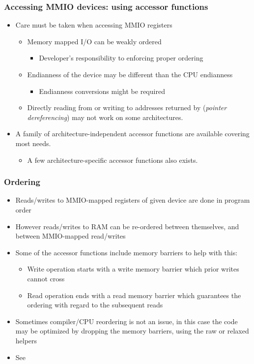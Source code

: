 \begin{frame}[fragile]
  \frametitle{Accessing MMIO devices: using accessor functions}
  \begin{itemize}
  \item Care must be taken when accessing MMIO registers
    \begin{itemize}
    \item Memory mapped I/O can be weakly ordered
      \begin{itemize}
      \item Developer's responsibility to enforcing proper ordering
      \end{itemize}
    \item Endianness of the device may be different than the CPU endianness
      \begin{itemize}
      \item Endianness conversions might be required
      \end{itemize}
    \item Directly reading from or writing to addresses returned by
       (\emph{pointer dereferencing}) may not work on some
      architectures.
    \end{itemize}
  \item A family of architecture-independent accessor functions are
    available covering most needs.
    \begin{itemize}
    \item A few architecture-specific accessor functions also exists.
    \end{itemize}
  \end{itemize}
\end{frame}

\begin{frame}[fragile]
  \frametitle{Ordering}
  \begin{itemize}
  \item Reads/writes to MMIO-mapped registers of given device are done
    in program order
  \item However reads/writes to RAM can be re-ordered between
    themselves, and between MMIO-mapped read/writes
  \item Some of the accessor functions include memory barriers to help
    with this:
    \begin{itemize}
    \item Write operation starts with a write memory barrier which prior
      writes cannot cross
    \item Read operation ends with a read memory barrier which
      guarantees the ordering with regard to the subsequent reads
    \end{itemize}
  \item Sometimes compiler/CPU reordering is not an issue, in this case
    the code may be optimized by dropping the memory barriers, using the
    raw or relaxed helpers
  \item See 
  \end{itemize}
\end{frame}

